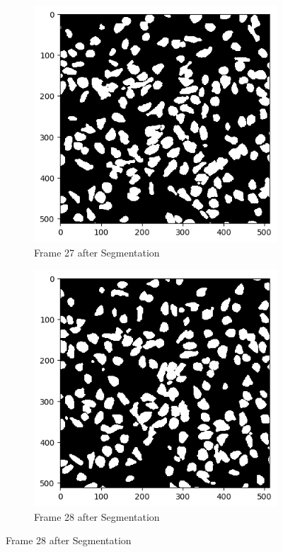 \documentclass{article}
\begin{document}
\begin{figure}[h!]
  \begin{subfigure}{0.4\textwidth}
    \includegraphics[width=\linewidth]{Report/Appendix_Images/Segmentation-B-Growth/frame_27.png}
    \caption*{Frame 27 after Segmentation}
  \end{subfigure}
  \hfill
  \begin{subfigure}{0.4\textwidth}
    \includegraphics[width=\linewidth]{Report/Appendix_Images/Segmentation-B-Growth/frame_28.png}
    \caption*{Frame 28 after Segmentation}
  \end{subfigure}


\end{figure}
\end{document}
